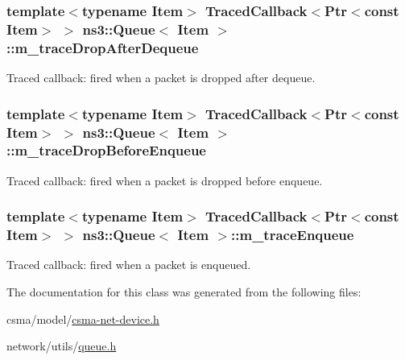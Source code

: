 \subsubsection[{\texorpdfstring{m\+\_\+trace\+Drop\+After\+Dequeue}{m_traceDropAfterDequeue}}]{\setlength{\rightskip}{0pt plus 5cm}template$<$typename Item$>$ {\bf Traced\+Callback}$<${\bf Ptr}$<$const Item$>$ $>$ {\bf ns3\+::\+Queue}$<$ Item $>$\+::m\+\_\+trace\+Drop\+After\+Dequeue\hspace{0.3cm}{\ttfamily [private]}}\hypertarget{classns3_1_1Queue_a9182ff9fab4c097f437eba67dc442762}{}\label{classns3_1_1Queue_a9182ff9fab4c097f437eba67dc442762}


Traced callback\+: fired when a packet is dropped after dequeue. 

\subsubsection[{\texorpdfstring{m\+\_\+trace\+Drop\+Before\+Enqueue}{m_traceDropBeforeEnqueue}}]{\setlength{\rightskip}{0pt plus 5cm}template$<$typename Item$>$ {\bf Traced\+Callback}$<${\bf Ptr}$<$const Item$>$ $>$ {\bf ns3\+::\+Queue}$<$ Item $>$\+::m\+\_\+trace\+Drop\+Before\+Enqueue\hspace{0.3cm}{\ttfamily [private]}}\hypertarget{classns3_1_1Queue_a97022bc9ac1f1729b9069c6a9abdabdb}{}\label{classns3_1_1Queue_a97022bc9ac1f1729b9069c6a9abdabdb}


Traced callback\+: fired when a packet is dropped before enqueue. 

\subsubsection[{\texorpdfstring{m\+\_\+trace\+Enqueue}{m_traceEnqueue}}]{\setlength{\rightskip}{0pt plus 5cm}template$<$typename Item$>$ {\bf Traced\+Callback}$<${\bf Ptr}$<$const Item$>$ $>$ {\bf ns3\+::\+Queue}$<$ Item $>$\+::m\+\_\+trace\+Enqueue\hspace{0.3cm}{\ttfamily [private]}}\hypertarget{classns3_1_1Queue_a5b68f278485844894ca6395c25d8fefd}{}\label{classns3_1_1Queue_a5b68f278485844894ca6395c25d8fefd}


Traced callback\+: fired when a packet is enqueued. 



The documentation for this class was generated from the following files\+:\begin{DoxyCompactItemize}
\item 
csma/model/\hyperlink{csma-net-device_8h}{csma-\/net-\/device.\+h}\item 
network/utils/\hyperlink{queue_8h}{queue.\+h}\end{DoxyCompactItemize}
